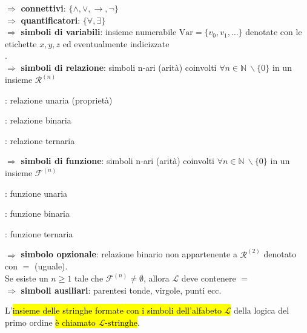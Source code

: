 \documentclass[a4paper, 12pt]{book}
\newcommand{\definizione}[2]{%
\vspace{15pt}%
\begin{tcolorbox}[
  colback=cyan!5!white,
  colframe=blue!50!black,
  title=\textbf{Definizione: #1}, %
  coltitle=white,
  fonttitle=\bfseries,
  arc=3mm,
  boxrule=0.5pt,
  enhanced,
  breakable
]
#2 %
\end{tcolorbox}
\vspace{15pt}%
}
\begin{document}
\definizione{alfabeto della logica del primo ordine}{$\Rightarrow$ \textbf{connettivi}: $\{\land, \lor, \rightarrow, \lnot\}$ \\[0.2ex]

$\Rightarrow$ \textbf{quantificatori}: $\{\forall, \exists\}$ \\[0.2ex]

$\Rightarrow$ \textbf{simboli di variabili}: insieme numerabile $\text{Var} = \{v_0, v_1, \dots\}$ denotate con le etichette $x, y, z$ ed eventualmente indicizzate \\[0.2ex]. \\[0.2ex]
$\Rightarrow$ \textbf{simboli di relazione}: simboli n-ari (arità) coinvolti $\forall n \in \mathbb{N} \ \backslash \{0\}$ in un insieme $\mathcal{R}^{(n)}$
\begin{description}[leftmargin=2cm]
  \item [$\mathcal{R}^{(1)}$]: relazione unaria (proprietà)
  \item [$\mathcal{R}^{(2)}$]: relazione binaria
  \item [$\mathcal{R}^{(3)}$]: relazione ternaria
  \item [$\vdots$]
\end{description}

$\Rightarrow$ \textbf{simboli di funzione}: simboli n-ari (arità) coinvolti $\forall n \in \mathbb{N} \ \backslash \{0\}$ in un insieme $\mathcal{F}^{(n)}$
\begin{description}[leftmargin=2cm]
  \item [$\mathcal{F}^{(1)}$]: funzione unaria
  \item [$\mathcal{F}^{(2)}$]: funzione binaria
  \item [$\mathcal{F}^{(3)}$]: funzione ternaria
  \item [$\vdots$]
\end{description}

$\Rightarrow$ \textbf{simbolo opzionale}: relazione binario non appartenente a $\mathcal{R}^{(2)}$ denotato con $=$ (uguale).\\
Se esiste un $n \geq 1$ tale che $\mathcal{F}^{(n)} \neq \emptyset$, allora $\mathcal{L}$ deve contenere $=$ \\[0.2ex]

$\Rightarrow$ \textbf{simboli ausiliari}: parentesi tonde, virgole, punti ecc.}

L'\hl{insieme delle stringhe formate con i simboli dell'alfabeto $\mathcal{L}$} della logica del primo ordine \hl{è chiamato \textbf{$\mathcal{L}\text{-stringhe}$}}.
\end{document}
